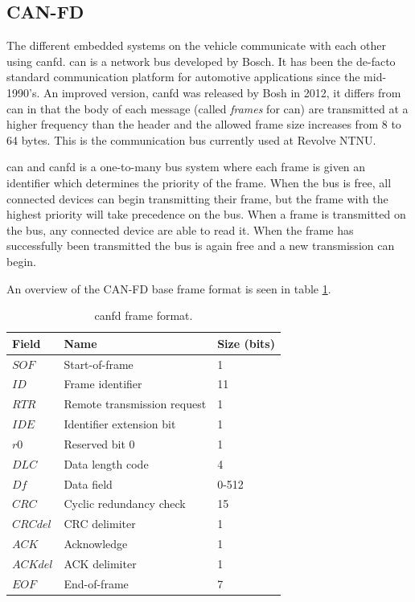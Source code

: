 \subsection{CAN-FD}

The different embedded systems on the vehicle communicate with each other using \acrshort{canfd}. \acrfull{can} is a network bus developed by Bosch. It has been the de-facto standard communication platform for automotive applications since the mid-1990's. An improved version, \acrfull{canfd} was released by Bosh in 2012, it differs from \acrshort{can} in that the body of each message (called \emph{frames} for \acrshort{can}) are transmitted at a higher frequency than the header and the allowed frame size increases from 8 to 64 bytes. This is the communication bus currently used at Revolve NTNU.

\acrshort{can} and \acrshort{canfd} is a one-to-many bus system where each frame is given an identifier which determines the priority of the frame. When the bus is free, all connected devices can begin transmitting their frame, but the frame with the highest priority will take precedence on the bus. When a frame is transmitted on the bus, any connected device are able to read it. When the frame has successfully been transmitted the bus is again free and a new transmission can begin.

An overview of the CAN-FD base frame format is seen in table \ref{tab:can_frame}.

\begin{table}[H]
    \centering
    \caption{\acrshort{canfd} frame format.}
    \begin{tabular}{lll}
        \toprule
        Field & Name & Size (bits) \\
        \midrule
        $SOF$ & Start-of-frame & 1 \\
        $ID$ & Frame identifier & 11 \\
        $RTR$ & Remote transmission request & 1 \\
        $IDE$ & Identifier extension bit & 1 \\
        $r0$ & Reserved bit 0 & 1 \\
        $DLC$ & Data length code & 4 \\
        $Df$ & Data field & 0-512 \\
        $CRC$ & Cyclic redundancy check & 15 \\
        $CRCdel$ & CRC delimiter & 1 \\
        $ACK$ & Acknowledge & 1 \\
        $ACKdel$ & ACK delimiter & 1 \\
        $EOF$ & End-of-frame & 7 \\
        \bottomrule
    \end{tabular}
    \label{tab:can_frame}
\end{table}

